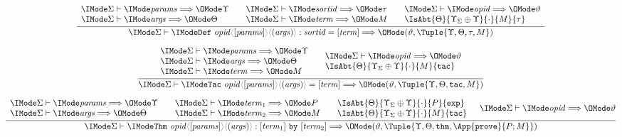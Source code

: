 \documentclass{report}
\begin{document}
\begin{gather}
  \infer{
    \Elab{\Sigma}{
      \DefDecl{\SortOpId}{\SortParams}{\SortArgs}{\SortSortId}{\SortTerm}
    }{(\vartheta,\Tuple{\Upsilon,\Theta,\tau,M})}
  }{
    \begin{array}{l}
      \Elab{\Sigma}{\SortParams}{\Upsilon}\\
      \Elab{\Sigma}{\SortArgs}{\Theta}\\
    \end{array} &
    \begin{array}{l}
      \Elab{\Sigma}{\SortSortId}{\tau}\\
      \Elab{\Sigma}{\SortTerm}{M}
    \end{array} &
    \begin{array}{l}
      \Elab{\Sigma}{\SortOpId}{\vartheta}\\
      \IsAbt{\Theta}{\Upsilon_\Sigma\oplus\Upsilon}{\cdot}{M}{\tau}
    \end{array}
  }\\[6pt]
  \infer{
    \Elab{\Sigma}{
      \TacDecl{\SortOpId}{\SortParams}{\SortArgs}{\SortTerm}
    }{(\vartheta,\Tuple{\Upsilon,\Theta,\AbtSortTac,M})}
  }{
    \begin{array}{l}
      \Elab{\Sigma}{\SortParams}{\Upsilon}\\
      \Elab{\Sigma}{\SortArgs}{\Theta}\\
      \Elab{\Sigma}{\SortTerm}{M}
    \end{array} &
    \begin{array}{l}
      \Elab{\Sigma}{\SortOpId}{\vartheta}\\
      \IsAbt{\Theta}{\Upsilon_\Sigma\oplus\Upsilon}{\cdot}{M}{\AbtSortTac}
    \end{array}
  }\\[6pt]
  \infer{
    \Elab{\Sigma}{
      \ThmDecl{\SortOpId}{\SortParams}{\SortArgs}{\SortTerm_1}{\SortTerm_2}
    }{(\vartheta,\Tuple{\Upsilon,\Theta,\AbtSortThm,\App{\OpProve}{P;M}})}
  }{
    \begin{array}{l}
      \Elab{\Sigma}{\SortParams}{\Upsilon}\\
      \Elab{\Sigma}{\SortArgs}{\Theta}
    \end{array} &
    \begin{array}{l}
      \Elab{\Sigma}{\SortTerm_1}{P}\\
      \Elab{\Sigma}{\SortTerm_2}{M}
    \end{array} &
    \begin{array}{l}
      \IsAbt{\Theta}{\Upsilon_\Sigma\oplus\Upsilon}{\cdot}{P}{\AbtSortExp}\\
      \IsAbt{\Theta}{\Upsilon_\Sigma\oplus\Upsilon}{\cdot}{M}{\AbtSortTac}
    \end{array} &
    \Elab{\Sigma}{\SortOpId}{\vartheta}
  }
\end{gather}
\end{document}
